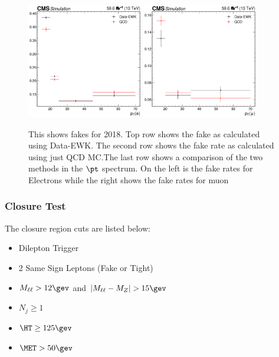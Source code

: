 \begin{figure}
  \includegraphics[width=0.45\textwidth]{measurement/2018/fr_Electron_pt.png} \hfill
  \includegraphics[width=0.45\textwidth]{measurement/2018/fr_Muon_pt.png} \\
  \caption{This shows fakes for 2018. Top row shows the fake as calculated using Data-EWK. The second row shows the fake rate as calculated using just QCD MC.\@ The last row shows a comparison of the two methods in the $\pt$ spectrum. On the left is the fake rates for Electrons while the right shows the fake rates for muon}
\end{figure}

\subsubsection{Closure Test}\label{sec:nonprompt:closure}

The closure region cuts are listed below:

\begin{itemize}
  \item Dilepton Trigger
  \item 2 Same Sign Leptons (Fake or Tight)
  \item $M_{\ell\ell} > 12\gev$ and $|M_{\ell\ell}-M_{Z}| > 15\gev$
  \item $N_{j} \ge 1$
  \item $\HT \ge 125\gev$
  \item $\MET > 50\gev$
\end{itemize}




